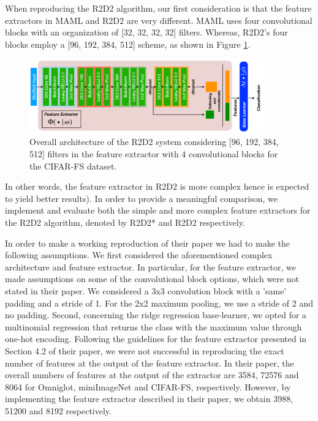 When reproducing the R2D2 algorithm, our first consideration is that the feature extractors in MAML and R2D2 are very different. MAML uses four convolutional blocks with an organization of [32, 32, 32, 32] filters. Whereas, R2D2's four blocks employ a [96, 192, 384, 512] scheme, as shown in Figure \ref{fig:arch}.
\begin{figure}
  \centering
  \includegraphics[width=0.9\textwidth]{Archi.pdf}
  \caption{Overall architecture of the R2D2 system considering [96, 192, 384, 512] filters in the feature extractor with 4 convolutional blocks for the \textsc{CIFAR-FS} dataset.}
  \label{fig:arch}
\end{figure}
In other words, the feature extractor in R2D2 is more complex hence is expected to yield better results\supercite{mhaskar2016learning}). In order to provide a meaningful comparison, we implement and evaluate both the simple and more complex feature extractors for the R2D2 algorithm, denoted by R2D2* and R2D2 respectively.

In order to make a working reproduction of their paper we had to make the following assumptions. We first considered the aforementioned complex architecture and feature extractor. In particular, for the feature extractor, we made assumptions on some of the convolutional block options, which were not stated in their paper. We considered a 3x3 convolution block with a 'same' padding and a stride of 1. For the 2x2 maximum pooling, we use a stride of 2 and no padding. Second, concerning the ridge regression base-learner, we opted for a multinomial regression that returns the class with the maximum value through one-hot encoding.
Following the guidelines for the feature extractor presented in Section 4.2 of their paper, we were not successful in reproducing the exact number of features at the output of the feature extractor. In their paper, the overall numbers of features at the output of the extractor are 3584, 72576 and 8064 for Omniglot, miniImageNet and \textsc{CIFAR-FS}, respectively. However, by implementing the feature extractor described in their paper, we obtain 3988, 51200 and 8192 respectively.


